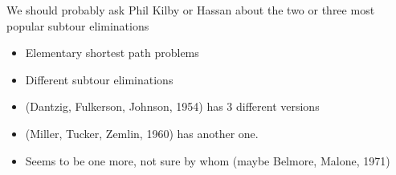 
We should probably ask Phil Kilby or Hassan about the two or three most popular subtour eliminations

\begin{itemize}
	\item Elementary shortest path problems
	\item Different subtour eliminations
  	\item (Dantzig, Fulkerson, Johnson, 1954) has 3 different versions
  	\item (Miller, Tucker, Zemlin, 1960) has another one.
  	\item Seems to be one more, not sure by whom (maybe Belmore, Malone, 1971)

\end{itemize}
